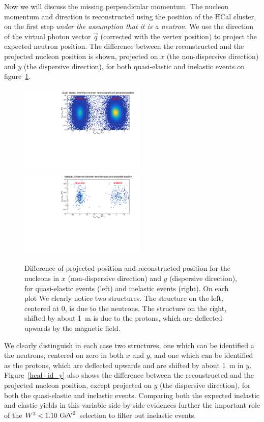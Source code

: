 \documentclass[11pt]{article}
\begin{document}
Now we will discuss the missing perpendicular momentum.
The nucleon momentum and direction is reconstructed using the position of the HCal cluster, on the first step {\em under the assumption that it is a neutron}.
We use the direction of the virtual photon vector $\vec{q}$ (corrected with the vertex position) to project the expected neutron position.
The difference between the reconstructed and the projected nucleon position is shown, projected on $x$ (the non-dispersive direction) and $y$ (the dispersive direction), for both quasi-elastic and inelastic events on figure~\ref{hcal_id_2D}.
%
\begin{figure}[!h]
  \centering
    \includegraphics[width=6cm]{HCal_PID_QE.pdf}
    \includegraphics[width=6cm]{HCal_PID_Inel.pdf}
    \caption{Difference of projected position and reconstructed position for the nucleons in $x$ (non-dispersive direction) and $y$ (dispersive direction), for quasi-elastic events (left) and inelastic events (right). On each plot We clearly notice two structures. The structure on the left, centered at 0, is due to the neutrons. The structure on the right, shifted by about 1~m is due to the protons, which are deflected upwards by the magnetic field. 
    }
    \label{hcal_id_2D}
\end{figure}
%
We clearly distinguish in each case two structures, one which can be identified a the neutrons, centered on zero in both $x$ and $y$, and one which can be identified as the protons, which are deflected upwards and are shifted by about 1~m in $y$.
Figure~\ref{hcal_id_y} also shows the difference between the reconstructed and the projected nucleon position, except projected on $y$ (the dispersive direction), for both the quasi-elastic and inelastic events. Comparing both the expected inelastic and elastic yields in this variable side-by-side evidences further the important role of the $W^2<1.10~{\rm GeV}^2$ selection to filter out inelastic events. 
\end{document}
